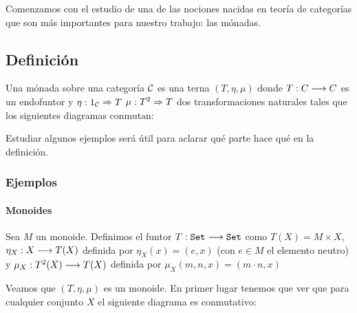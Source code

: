 Comenzamos con el estudio de una de las nociones nacidas
en teoría de categorías que son
más importantes para nuestro trabajo: las mónadas.


\subsection{Definición}
\begin{definition}
  Una mónada sobre una categoría $\mathcal{C}$
  es una terna $(T, \eta, \mu)$ donde $T : C\longrightarrow C$ es un
  endofuntor y $\eta : 1_{\mathcal{C}}\Rightarrow T$ $\mu: T^2\Rightarrow T$ dos
  transformaciones naturales tales que los siguientes diagramas
  conmutan:


  \begin{center}

  \end{center}
\end{definition}

Estudiar algunos ejemplos será útil para aclarar qué parte hace qué
en la definición.

\subsubsection{Ejemplos}
\paragraph{Monoides}
Sea $M$ un monoide. Definimos el funtor $T : \texttt{Set}\longrightarrow \texttt{Set}$
como $T(X) = M\times X$, $\eta_X : X\longrightarrow T(X)$ definida
por $\eta_X(x) = (e, x)$ (con $e \in M$ el elemento neutro)
y $\mu_X : T^2(X)\longrightarrow T(X)$ definida por
$\mu_X(m, n, x) = (m\cdot n, x)$

Veamos que $(T, \eta, \mu)$ es un monoide. En primer lugar
tenemos que ver que para cualquier conjunto $X$ el siguiente
diagrama es conmutativo:

